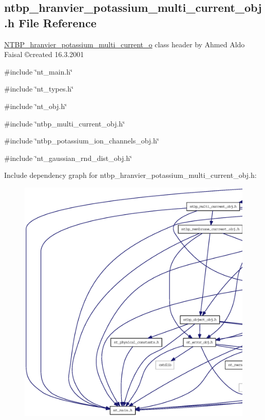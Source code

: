 \subsection{ntbp\_\-hranvier\_\-potassium\_\-multi\_\-current\_\-obj.h File Reference}
\label{ntbp__hranvier__potassium__multi__current__obj_8h}



\begin{DoxyItemize}
\item \hyperlink{class_n_t_b_p__hranvier__potassium__multi__current__o}{NTBP\_\-hranvier\_\-potassium\_\-multi\_\-current\_\-o} class header by Ahmed Aldo Faisal \copyright created 16.3.2001 
\end{DoxyItemize} 


{\ttfamily \#include \char`\"{}nt\_\-main.h\char`\"{}}\par
{\ttfamily \#include \char`\"{}nt\_\-types.h\char`\"{}}\par
{\ttfamily \#include \char`\"{}nt\_\-obj.h\char`\"{}}\par
{\ttfamily \#include \char`\"{}ntbp\_\-multi\_\-current\_\-obj.h\char`\"{}}\par
{\ttfamily \#include \char`\"{}ntbp\_\-potassium\_\-ion\_\-channels\_\-obj.h\char`\"{}}\par
{\ttfamily \#include \char`\"{}nt\_\-gaussian\_\-rnd\_\-dist\_\-obj.h\char`\"{}}\par
Include dependency graph for ntbp\_\-hranvier\_\-potassium\_\-multi\_\-current\_\-obj.h:
\nopagebreak
\begin{figure}[H]
\begin{center}
\leavevmode
\includegraphics[width=400pt]{ntbp__hranvier__potassium__multi__current__obj_8h__incl}
\end{center}
\end{figure}

